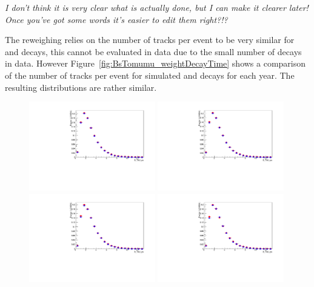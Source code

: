 {\it I don't think it is very clear what is actually done, but I can make it clearer later! Once you've got some words it's easier to edit them right?!?}

The reweighing relies on the number of tracks per event to be very similar for \bdkpi and \bsmumu decays, this cannot be evaluated in data due to the small number of \bsmumu decays in data. However Figure~\ref{fig:BsTomumu_weightDecayTime} shows a comparison of the number of tracks per event for simulated \bsmumu and \bdkpi decays for each year. The resulting distributions are rather similar.
\begin{figure}[ht]
  \centering
    \includegraphics[width=0.49\textwidth]{./Figs/LifetimeMeasurement/2011_Bs2MuMu_MC_weighted_unweighted_comparison.pdf}
    \includegraphics[width=0.49\textwidth]{./Figs/LifetimeMeasurement/2012_Bs2MuMu_MC_weighted_unweighted_comparison.pdf}
    \includegraphics[width=0.49\textwidth]{./Figs/LifetimeMeasurement/2015_Bs2MuMu_MC_weighted_unweighted_comparison.pdf}
    \includegraphics[width=0.49\textwidth]{./Figs/LifetimeMeasurement/2016_Bs2MuMu_MC_weighted_unweighted_comparison.pdf}

\end{figure}
